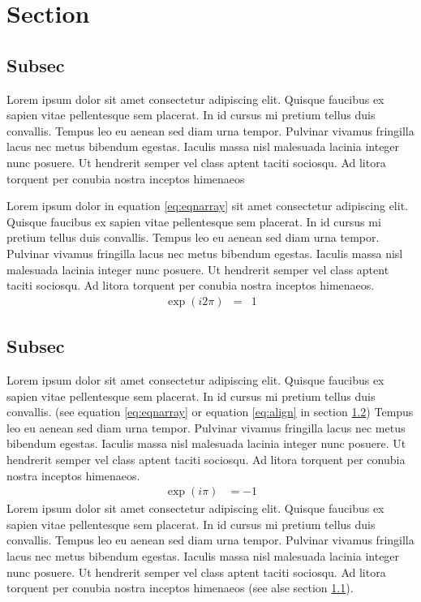 \documentclass{article}
\begin{document}
\section{Section}
\subsection{Subsec}\label{sec:first}
Lorem ipsum dolor sit amet consectetur adipiscing elit. Quisque
faucibus ex sapien vitae pellentesque sem placerat. In id cursus mi
pretium tellus duis convallis. Tempus leo eu aenean sed diam urna
tempor. Pulvinar vivamus fringilla lacus nec metus bibendum egestas.
Iaculis massa nisl malesuada lacinia integer nunc posuere. Ut
hendrerit semper vel class aptent taciti sociosqu. Ad litora torquent
per conubia nostra inceptos himenaeos

Lorem ipsum dolor in equation \eqref{eq:eqnarray} sit amet consectetur
adipiscing elit. Quisque faucibus ex sapien vitae pellentesque sem
placerat. In id cursus mi pretium tellus duis convallis. Tempus leo eu
aenean sed diam urna tempor. Pulvinar vivamus fringilla lacus nec
metus bibendum egestas. Iaculis massa nisl malesuada lacinia integer
nunc posuere. Ut hendrerit semper vel class aptent taciti sociosqu. Ad
litora torquent per conubia nostra inceptos himenaeos.
\begin{eqnarray}
  \label{eq:eqnarray}
  \exp(i2\pi)&=&1
\end{eqnarray}

\subsection{Subsec}\label{sec:second}
Lorem ipsum dolor sit amet consectetur adipiscing elit. Quisque
faucibus ex sapien vitae pellentesque sem placerat. In id cursus mi
pretium tellus duis convallis. (see equation \eqref{eq:eqnarray} or
equation \ref{eq:align} in section \ref{sec:second}) Tempus leo eu
aenean sed diam urna tempor. Pulvinar vivamus fringilla lacus nec
metus bibendum egestas. Iaculis massa nisl malesuada lacinia integer
nunc posuere. Ut hendrerit semper vel class aptent taciti sociosqu. Ad
litora torquent per conubia nostra inceptos himenaeos.
\begin{align}
  \label{eq:align}
  \exp(i\pi)&=-1
\end{align}
Lorem ipsum dolor sit amet consectetur adipiscing elit. Quisque
faucibus ex sapien vitae pellentesque sem placerat. In id cursus mi
pretium tellus duis convallis. Tempus leo eu aenean sed diam urna
tempor. Pulvinar vivamus fringilla lacus nec metus bibendum egestas.
Iaculis massa nisl malesuada lacinia integer nunc posuere. Ut
hendrerit semper vel class aptent taciti sociosqu. Ad litora torquent
per conubia nostra inceptos himenaeos (see alse section \ref{sec:first}).
\end{document}
